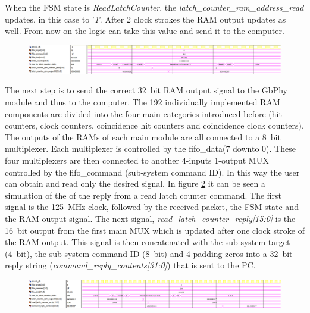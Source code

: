 \noindent When the FSM state is \textit{ReadLatchCounter}, the \textit{latch\_counter\_ram\_address\_read} updates, in this case to '\textit{1}'. After 2 clock strokes the RAM output updates as well. From now on the logic can take this value and send it to the computer. 
\begin{figure}[H]
	\centering
	\includegraphics[width=1.0\linewidth]{IMG/ch4/LATCHsimulations/READLATCH}
	\caption{}
	\label{fig:readlatch}
\end{figure}
\noindent The next step is to send the correct 32~bit RAM output signal to the GbPhy module and thus to the computer.
The 192 individually implemented RAM components are divided into the four main categories introduced before (hit counters, clock counters, coincidence hit counters and coincidence clock counters).
The outputs of the RAMs of each main module are all connected to a 8~bit multiplexer. Each multiplexer is controlled by the fifo\_data(7 downto 0). These four multiplexers are then connected to another 4-inputs 1-output MUX controlled by the fifo\_command (sub-system command ID). In this way the user can obtain and read only the desired signal.
In figure \ref{fig:replylatch} it can be seen a simulation of the of the reply from a read latch counter command.
The first signal is the 125~MHz clock, followed by the received packet, the FSM state and the RAM output signal.
The next signal, \textit{read\_latch\_counter\_reply[15:0]} is the 16~bit output from the first main MUX which is updated after one clock stroke of the RAM output.
This signal is then concatenated with the sub-system target (4~bit), the sub-system command ID (8~bit) and 4 padding zeros into a 32~bit reply string (\textit{command\_reply\_contents[31:0]}) that is sent to the PC. 
\begin{figure}[H]
	\centering
	\includegraphics[width=1.0\linewidth]{IMG/ch4/LATCHsimulations/REPLYLATCH}
	\caption{}
	\label{fig:replylatch}
\end{figure}
